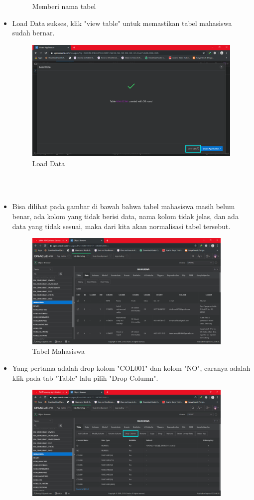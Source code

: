 \documentclass[12pt, times new roman]{article}
\begin{document}
\begin{itemize}
\begin{figure}[htbp]
	\caption{Memberi nama tabel}
\end{figure}
\item Load Data sukses, klik "view table" untuk memastikan tabel mahasiswa sudah bernar.
\begin{figure}[htbp]
	\centering
	\includegraphics[width=10.5cm]{figures/9.png}
	\caption{Load Data}
\end{figure}\\
\\
\item Bisa dilihat pada gambar di bawah bahwa tabel mahasiswa masih belum benar, ada kolom yang tidak berisi data, nama kolom tidak jelas, dan ada data yang tidak sesuai, maka dari kita akan normalisasi tabel tersebut.
\begin{figure}[htbp]
	\centering
	\includegraphics[width=10cm]{figures/10.png}
	\caption{Tabel Mahasiswa}
\end{figure}
\item Yang pertama adalah drop kolom "COL001" dan kolom "NO", caranya adalah klik pada tab "Table" lalu pilih "Drop Column".
\begin{figure}[htbp]
	\centering
	\includegraphics[width=10cm]{figures/11.png}

\end{figure}
\end{itemize}
\end{document}
